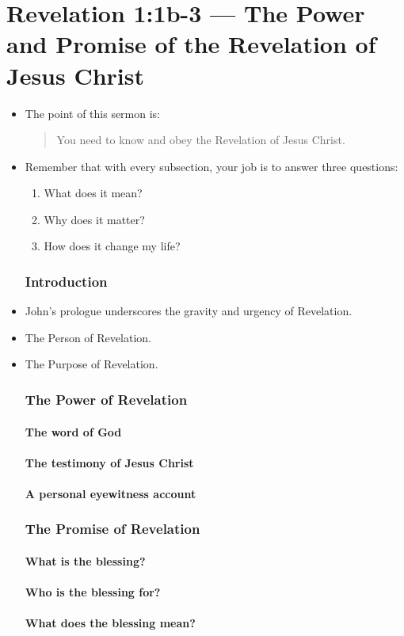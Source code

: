 \documentclass[12pt]{article}
\newcommand{\BI}{\begin{itemize}}
\newcommand{\EI}{\end{itemize}}
\newcommand{\I}{\item}
\begin{document}
\part*{Revelation 1:1b-3 --- The Power and Promise of the Revelation of Jesus Christ}
\tableofcontents
\BI
\section*{Notes}
\I  The point of this sermon is:
        \begin{quote} 
        You need to know and obey the Revelation of Jesus Christ.
        \end{quote}
\I  Remember that with every subsection, your job is to answer three questions:
    \begin{enumerate}
    \I  What does it mean?
    \I  Why does it matter?
    \I  How does it change my life?
    \end{enumerate}


\section*{Introduction}
\I  John's prologue underscores the gravity and urgency of Revelation.
\I  The Person of Revelation.
\I  The Purpose of Revelation.

\section{The Power of Revelation}
\subsection{The word of God}
\subsection{The testimony of Jesus Christ}
\subsection{A personal eyewitness account}

\section{The Promise of Revelation}
\subsection{What is the blessing?}
\subsection{Who is the blessing for?}
\subsection{What does the blessing mean?}

\EI
\end{document}
